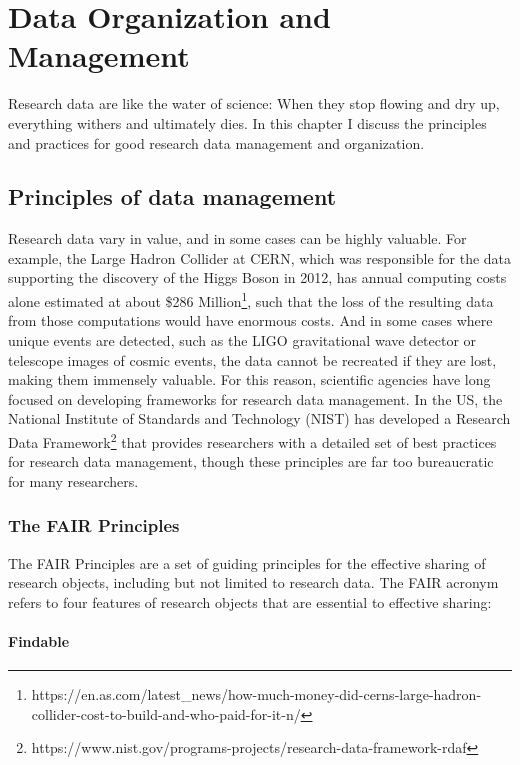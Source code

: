\chapter{Data Organization and Management}

Research data are like the water of science: When they stop flowing and dry up, everything withers and ultimately dies.  In this chapter I discuss the principles and practices for good research data management and organization.

\section{Principles of data management}

Research data vary in value, and in some cases can be highly valuable.  For example, the Large Hadron Collider at CERN, which was responsible for the data supporting the discovery of the Higgs Boson in 2012, has annual computing costs alone estimated at about \$286 Million\footnote{https://en.as.com/latest\_news/how-much-money-did-cerns-large-hadron-collider-cost-to-build-and-who-paid-for-it-n/}, such that the loss of the resulting data from those computations would have enormous costs. And in some cases where unique events are detected, such as the LIGO gravitational wave detector or telescope images of cosmic events, the data cannot be recreated if they are lost, making them immensely valuable.  For this reason, scientific agencies have long focused on developing frameworks for research data management. In the US, the National Institute of Standards and Technology (NIST) has developed a Research Data Framework\footnote{https://www.nist.gov/programs-projects/research-data-framework-rdaf} that provides researchers with a detailed set of best practices for research data management, though these principles are far too bureaucratic for many researchers.

\subsection{The FAIR Principles}

The FAIR Principles \citep{Wilkinson:2016aa} are a set of guiding principles for the effective sharing of research objects, including but not limited to research data.  The FAIR acronym refers to four features of research objects that are essential to effective sharing:

\subsubsection{Findable}

